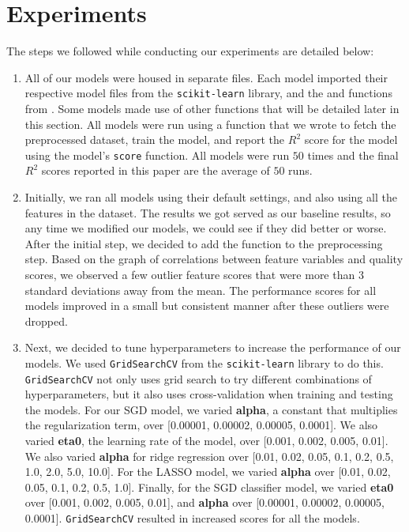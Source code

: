 


\section{Experiments}
\label{sec:expts}

The steps we followed while conducting our experiments are detailed below:
\begin{enumerate}
    \item All of our models were housed in separate files. Each model imported their respective model files from the \texttt{scikit-learn} library, and the  and  functions from . Some models made use of other functions that will be detailed later in this section. All models were run using a  function that we wrote to fetch the preprocessed dataset, train the model, and report the $R^2$ score for the model using the model's \texttt{score} function. All models were run $50$ times and the final $R^2$ scores reported in this paper are the average of $50$ runs.
    \item Initially, we ran all models using their default settings, and also using all the features in the dataset. The results we got served as our baseline results, so any time we modified our models, we could see if they did better or worse. After the initial step, we decided to add the  function to the preprocessing step. Based on the graph of correlations between feature variables and quality scores, we observed a few outlier feature scores that were more than $3$ standard deviations away from the mean. The performance scores for all models improved in a small but consistent manner after these outliers were dropped.
    \item Next, we decided to tune hyperparameters to increase the performance of our models. We used \texttt{GridSearchCV} from the \texttt{scikit-learn} library to do this. \texttt{GridSearchCV} not only uses grid search to try different combinations of hyperparameters, but it also uses cross-validation when training and testing the models. For our SGD model, we varied \textbf{alpha}, a constant that multiplies the regularization term, over [0.00001, 0.00002, 0.00005, 0.0001]. We also varied \textbf{eta0}, the learning rate of the model, over [0.001, 0.002, 0.005, 0.01]. We also varied \textbf{alpha} for ridge regression over [0.01, 0.02, 0.05, 0.1, 0.2, 0.5, 1.0, 2.0, 5.0, 10.0]. For the LASSO model, we varied \textbf{alpha} over [0.01, 0.02, 0.05, 0.1, 0.2, 0.5, 1.0]. Finally, for the SGD classifier model, we varied \textbf{eta0} over [0.001, 0.002, 0.005, 0.01], and \textbf{alpha} over [0.00001, 0.00002, 0.00005, 0.0001]. \texttt{GridSearchCV} resulted in increased scores for all the models.

\end{enumerate}
